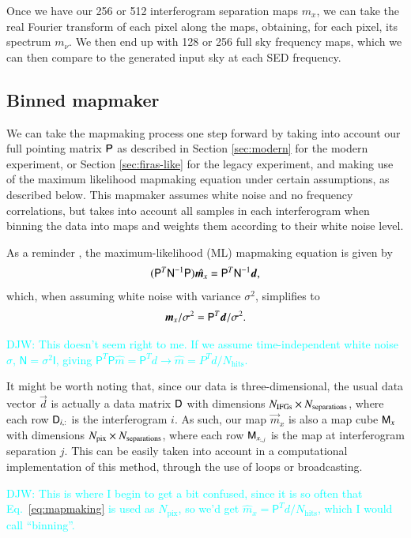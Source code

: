 \documentclass{aa}
\newcommand{\dv}[0]{\vec{d}}
\newcommand{\D}[0]{\tens{D}}
\newcommand{\m}[0]{\vec{m}}
\newcommand{\M}[0]{\tens{M}}
\newcommand{\iN}[0]{\tens{N}^{-1}}
\newcommand{\matP}[0]{\tens{P}}
\newcommand{\djw}[1]{\textcolor{cyan}{{DJW:} #1}}
\begin{document}
Once we have our 256 or 512 interferogram separation maps $m_x$, we can take the real Fourier transform of each pixel along the maps, obtaining, for each pixel, its spectrum $m_{\nu}$. We then end up with 128 or 256 full sky frequency maps, which we can then compare to the generated input sky at each SED frequency.

\subsection{Binned mapmaker}
\label{sec:binned-mapmaker}

We can take the mapmaking process one step forward by taking into account our full pointing matrix $\matP$ as described in Section \ref{sec:modern} for the modern experiment, or Section \ref{sec:firas-like} for the legacy experiment, and making use of the maximum likelihood mapmaking equation under certain assumptions, as described below. This mapmaker assumes white noise and no frequency correlations, but takes into account all samples in each interferogram when binning the data into maps and weights them according to their white noise level.

As a reminder \citep{tegmark1997}, the maximum-likelihood (ML) mapmaking equation is given by
\begin{equation}
    (\matP^T \iN \matP)\hat{\m_x} = \matP^T \iN \dv,
    \label{eq:mapmaking}
\end{equation}
which, when assuming white noise with variance $\sigma^2$, simplifies to
\begin{equation}
    \m_x/\sigma^2 = \matP^T \dv / \sigma^2.
\end{equation}

\djw{This doesn't seem right to me. If we assume time-independent white noise $\sigma$, $\mathsf N=\sigma^2\mathsf I$, giving
$\mathsf P^T\mathsf P\hat m=\mathsf P^Td\to \hat m=P^Td/N_\mathrm{hits}$.
}

It might be worth noting that, since our data is three-dimensional, the usual data vector $\dv$ is actually a data matrix $\D$ with dimensions $N_{\rm IFGs} \times N_{\rm separations}$, where each row $\D_{i,:}$ is the interferogram $i$. As such, our map $\m_x$ is also a map cube $\M_x$ with dimensions $N_{\rm pix} \times N_{\rm separations}$, where each row $\M_{x_{:,j}}$ is the map at interferogram separation $j$. This can be easily taken into account in a computational implementation of this method, through the use of loops or broadcasting.


\djw{This is where I begin to get a bit confused, since it is so often that Eq.~\eqref{eq:mapmaking} is used as $N_\mathrm{pix}$, so we'd get $\hat m_x=\mathsf P^Td/N_\mathrm{hits}$, which I would call ``binning''.}
\end{document}

